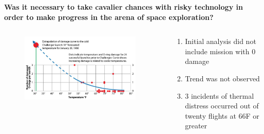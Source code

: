 \documentclass[aspectratio=1610,pdftex,dvipsnames,compress,xcolor={dvipsnames}]{beamer}
\begin{document}
\begin{frame}[plain]{}
    \centering\textbf{Was it necessary to take cavalier chances with risky technology in order to make progress in the arena of space exploration?}
\end{frame}


\addtocounter{framenumber}{-1}
\begin{frame}{}
    \begin{columns}[c]

        \begin{column}{0.65\textwidth}
            \begin{figure}
                \centering
                \includegraphics[width=0.95\textwidth]{challenger.jpg}
            \end{figure}
        \end{column}

        \begin{column}{0.35\textwidth}
            \begin{enumerate}[series=outerlist,topsep=0pt,itemsep=15pt,leftmargin=*,label=(\arabic*)]
                \item[]Initial analysis did not include mission with 0 damage  
                \item[]Trend was not observed
                \item[]3 incidents of thermal distress occurred out of twenty flights at 66\degree F or greater
            \end{enumerate}
        \end{column}

    \end{columns}
\end{frame}
\end{document}
